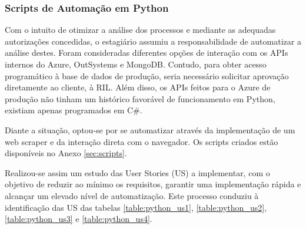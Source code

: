         \subsubsection{Scripts de Automação em Python}\label{secsec:scriptspython}

            Com o intuito de otimizar a análise dos processos e mediante as adequadas autorizações concedidas, o estagiário assumiu a responsabilidade de automatizar a análise destes. Foram consideradas diferentes opções de interação com os APIs internos do Azure, OutSystems e MongoDB. Contudo, para obter acesso programático à base de dados de produção, seria necessário solicitar aprovação diretamente ao cliente, à RIL. Além disso, os APIs feitos para o Azure de produção não tinham um histórico favorável de funcionamento em Python, existiam apenas programados em C\#.

            Diante a situação, optou-se por se automatizar através da implementação de um web scraper e da interação direta com o navegador. Os scripts criados estão disponíveis no Anexo \ref{sec:scripts}.

            \label{secsecsec:us_python}

                Realizou-se assim um estudo das User Stories (US) a implementar, com o objetivo de reduzir ao mínimo os requisitos, garantir uma implementação rápida e alcançar um elevado nível de automatização. Este processo conduziu à identificação das US das tabelas \ref{table:python_us1}, \ref{table:python_us2}, \ref{table:python_us3} e \ref{table:python_us4}.

